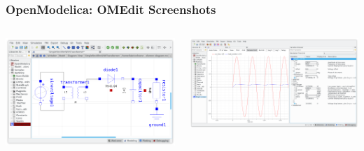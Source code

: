 \begin{frame}
  \frametitle{OpenModelica: OMEdit Screenshots}
  \begin{columns}
    \begin{column}[c]{.5\textwidth}
      \begin{center}
        \includegraphics[width=1.\textwidth]{images/omedit-schema.png}
      \end{center}
    \end{column}
    \begin{column}[c]{.5\textwidth}
      \begin{center}
        \includegraphics[width=1.\textwidth]{images/omedit-plot.png}
      \end{center}
    \end{column}
  \end{columns}
\end{frame}

